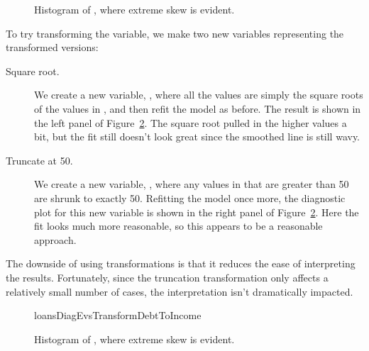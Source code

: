 \begin{figure}[h]
  \centering
  \caption{Histogram of ,
      where extreme skew is evident.}
  \label{loansDebtToIncomeHist}
\end{figure}

To try transforming the variable, we make two new variables
representing the transformed versions:
\begin{description}
\item[Square root.]
    We create a new variable,
    ,
    where all the values are simply the square roots of the
    values in ,
    and then refit the model as before.
    The result is shown in the left panel of
    Figure~\ref{loansDiagEvsTransformDebtToIncome}.
    The square root pulled in the higher values
    a bit, but the fit still doesn't look great
    since the smoothed line is still wavy.
\item[Truncate at 50.]
    We create a new variable,
    ,
    where any values in 
    that are greater than 50 are shrunk to exactly 50.
    Refitting the model once more,
    the diagnostic plot for this new variable is shown
    in the right panel of
    Figure~\ref{loansDiagEvsTransformDebtToIncome}.
    Here the fit looks much more reasonable,
    so this appears to be a reasonable approach.
\end{description}
The downside of using transformations is that it reduces
the ease of interpreting the results.
Fortunately, since the truncation transformation only affects
a relatively small number of cases, the interpretation
isn't dramatically impacted.

\begin{figure}[h]
  \centering
      {loansDiagEvsTransformDebtToIncome}
  \caption{Histogram of ,
      where extreme skew is evident.}
  \label{loansDiagEvsTransformDebtToIncome}
\end{figure}

\D{\newpage}


